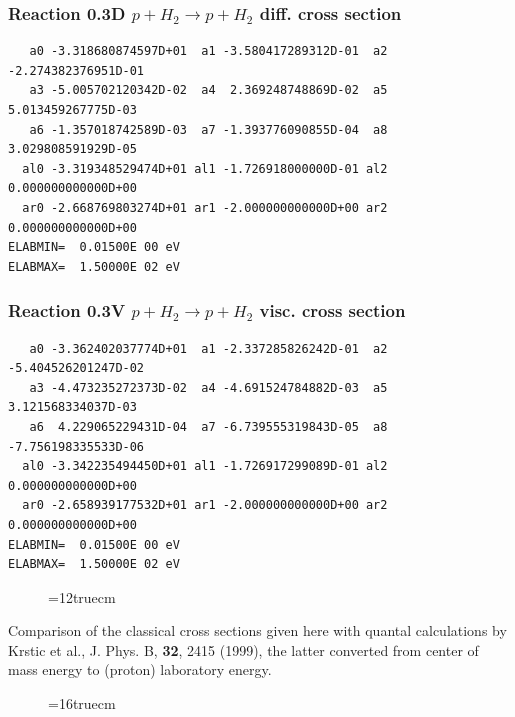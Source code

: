 \documentclass[12pt,dvips]{article}
\begin{document}
\subsubsection{
Reaction 0.3D   $ p + H_2 \rightarrow p + H_2 $  diff. cross section
}


\begin{small}\begin{verbatim}
   a0 -3.318680874597D+01  a1 -3.580417289312D-01  a2 -2.274382376951D-01
   a3 -5.005702120342D-02  a4  2.369248748869D-02  a5  5.013459267775D-03
   a6 -1.357018742589D-03  a7 -1.393776090855D-04  a8  3.029808591929D-05
  al0 -3.319348529474D+01 al1 -1.726918000000D-01 al2  0.000000000000D+00
  ar0 -2.668769803274D+01 ar1 -2.000000000000D+00 ar2  0.000000000000D+00
ELABMIN=  0.01500E 00 eV
ELABMAX=  1.50000E 02 eV
\end{verbatim}\end{small}

\subsubsection{
Reaction 0.3V   $  p + H_2 \rightarrow p + H_2  $ visc. cross section
}


\begin{small}\begin{verbatim}
   a0 -3.362402037774D+01  a1 -2.337285826242D-01  a2 -5.404526201247D-02
   a3 -4.473235272373D-02  a4 -4.691524784882D-03  a5  3.121568334037D-03
   a6  4.229065229431D-04  a7 -6.739555319843D-05  a8 -7.756198335533D-06
  al0 -3.342235494450D+01 al1 -1.726917299089D-01 al2  0.000000000000D+00
  ar0 -2.658939177532D+01 ar1 -2.000000000000D+00 ar2  0.000000000000D+00
ELABMIN=  0.01500E 00 eV
ELABMAX=  1.50000E 02 eV
\end{verbatim}\end{small}

\begin{figure}[hb] \label{0.3a}
\epsfxsize=12truecm
\end{figure}
Comparison of the classical cross sections given here with quantal calculations
by Krstic et al., J. Phys. B, \textbf{32}, 2415 (1999), the latter converted from center of mass energy to (proton) laboratory energy.

\newpage

\begin{figure} \label{0.3}
\epsfxsize=16truecm
\end{figure}
\newpage
\end{document}
